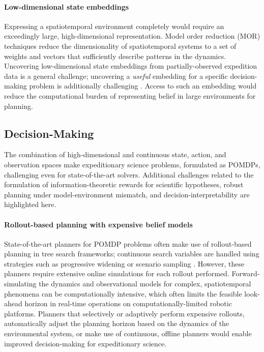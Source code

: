 \paragraph{Low-dimensional state embeddings}
Expressing a spatiotemporal environment completely would require an exceedingly large, high-dimensional representation. Model order reduction (MOR) techniques reduce the dimensionality of spatiotemporal systems to a set of weights and vectors that sufficiently describe patterns in the dynamics. Uncovering low-dimensional state embeddings from partially-observed expedition data is a general challenge\autocite{spantini2018inference}; uncovering a \emph{useful} embedding for a specific decision-making problem is additionally challenging \autocite{pacelli2019task}. Access to such an embedding would reduce the computational burden of representing belief in large environments for planning.


\subsection{Decision-Making}
The combination of high-dimensional and continuous state, action, and observation spaces make expeditionary science problems, formulated as POMDPs, challenging even for state-of-the-art solvers. Additional challenges related to the formulation of information-theoretic rewards for scientific hypotheses, robust planning under model-environment mismatch, and decision-interpretability are highlighted here.

\paragraph{Rollout-based planning with expensive belief models}
State-of-the-art planners for POMDP problems often make use of rollout-based planning in tree search frameworks; continuous search variables are handled using strategies such as progressive widening or scenario sampling \autocite{sunberg2018online}. However, these planners require extensive online simulations for each rollout performed. Forward-simulating the dynamics and observational models for complex, spatiotemporal phenomena can be computationally intensive, which often limits the feasible look-ahead horizon in real-time operations on computationally-limited robotic platforms.  Planners that selectively or adaptively perform expensive rollouts, automatically adjust the planning horizon based on the dynamics of the environmental system, or make use of continuous, offline planners would enable improved decision-making for expeditionary science.

